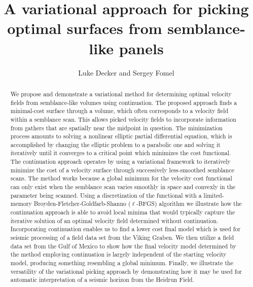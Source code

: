 \title{A variational approach for picking optimal surfaces from semblance-like panels}
\newtheorem{definition}{Definition}[section]
\author{Luke Decker and Sergey Fomel}
\address{
Oden Institute for Computational Engineering and Sciences \\
The University of Texas at Austin \\
201 E 24th St, \\
Austin, TX 78712 \\
decker.luke@utexas.edu
}
\maketitle

\begin{abstract}

We propose and demonstrate a variational method for determining optimal velocity fields from semblance-like volumes using continuation. The proposed approach finds a minimal-cost surface through a volume, which often corresponds to a velocity field within a semblance scan.  This allows picked velocity fields to incorporate information from gathers that are spatially near the midpoint in question.  The minimization process amounts to solving a nonlinear elliptic partial differential equation, which is accomplished by changing the elliptic problem to a parabolic one and solving it iteratively until it converges to a critical point which minimizes the cost functional. The continuation approach operates by using a variational framework to iteratively minimize the cost of a velocity surface through successively less-smoothed semblance scans.  The method works because a global minimum for the velocity cost functional can only exist when the semblance scan varies smoothly in space and convexly in the parameter being scanned.  Using a discretization of the functional with a limited-memory Broyden-Fletcher-Goldfarb-Shanno ($\ell$-BFGS) algorithm we illustrate how the continuation approach is able to avoid local minima that would typically capture the iterative solution of an optimal velocity field determined without continuation.  Incorporating continuation enables us to find a lower cost final model which is used for seismic processing of a field data set from the Viking Graben.  We then utilize a field data set from the Gulf of Mexico to show how the final velocity model determined by the method employing continuation is largely independent of the starting velocity model, producing something resembling a global minimum.  Finally, we illustrate the versatility of the variational picking approach by demonstrating how it may be used for automatic interpretation of a seismic horizon from the Heidrun Field.
\end{abstract}

